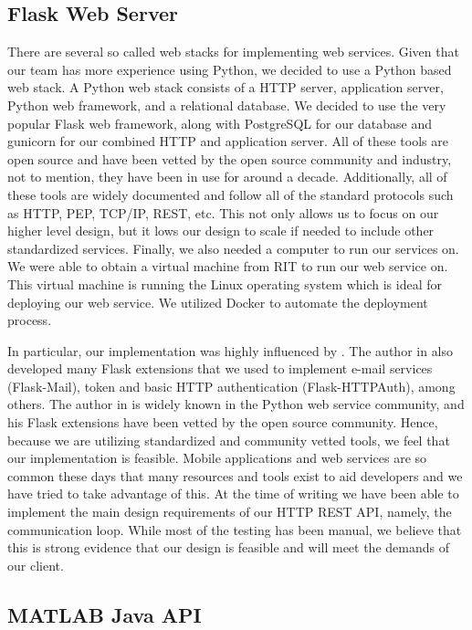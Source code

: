 \documentclass[conference]{IEEEtran}
\begin{document}
\subsection{Flask Web Server}

There are several so called web stacks for implementing web services. Given that our team has more experience using Python, we decided to use a Python based web stack. A Python web stack consists of a HTTP server, application server, Python web framework, and a relational database. We decided to use the very popular Flask web framework, along with PostgreSQL for our database and gunicorn for our combined HTTP and application server. All of these tools are open source and have been vetted by the open source community and industry, not to mention, they have been in use for around a decade. Additionally, all of these tools are widely documented and follow all of the standard protocols such as HTTP, PEP, TCP/IP, REST, etc. This not only allows us to focus on our higher level design, but it 
lows our design to scale if needed to include other standardized services. Finally, we also needed a computer to run our services on. We were able to obtain a virtual machine from RIT to run our web service on. This virtual machine is running the Linux operating system which is ideal for deploying our web service. We utilized Docker to automate the deployment process.

In particular, our implementation was highly influenced by \cite{grinberg2018new}. The author in \cite{grinberg2018new} also developed many Flask extensions that we used to implement e-mail services (Flask-Mail), token and basic HTTP authentication (Flask-HTTPAuth), among others. The author in \cite{grinberg2018new} is widely known in the Python web service community, and his Flask extensions have been vetted by the open source community. Hence, because we are utilizing standardized and community vetted tools, we feel that our implementation is feasible. Mobile applications and web services are so common these days that many resources and tools exist to aid developers and we have tried to take advantage of this. At the time of writing we have been able to implement the main design requirements of our HTTP REST API, namely, the communication loop. While most of the testing has been manual, we believe that this is strong evidence that our design is feasible and will meet the demands of our client.

\subsection{MATLAB Java API}
\end{document}
